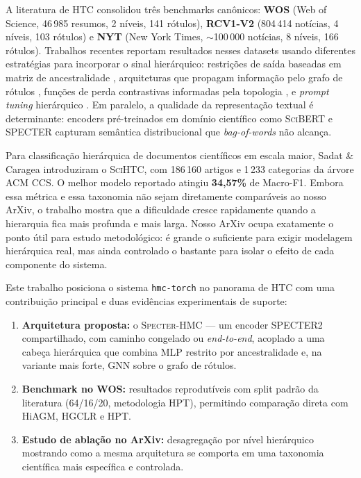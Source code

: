 \documentclass[11pt,a4paper,twoside]{article}
\begin{document}
A literatura de HTC consolidou três benchmarks canônicos: \textbf{WOS} (Web of Science,
46\,985 resumos, 2 níveis, 141 rótulos), \textbf{RCV1-V2} (804\,414 notícias, 4 níveis,
103 rótulos) e \textbf{NYT} (New York Times, $\sim$100\,000 notícias, 8 níveis, 166
rótulos). Trabalhos recentes reportam resultados nesses datasets usando diferentes
estratégias para incorporar o sinal hierárquico: restrições de saída baseadas em
matriz de ancestralidade \cite{giunchiglia2020coherent}, arquiteturas que propagam
informação pelo grafo de rótulos \cite{zhou2020hiagm}, funções de perda contrastivas
informadas pela topologia \cite{wang2022hgclr}, e \textit{prompt tuning} hierárquico
\cite{wang2022hpt}. Em paralelo, a qualidade da representação textual é determinante:
encoders pré-treinados em domínio científico como \textsc{SciBERT}
\cite{beltagy2019scibert} e \textsc{SPECTER} \cite{cohan2020specter} capturam
semântica distribucional que \textit{bag-of-words} não alcança.

Para classificação hierárquica de documentos científicos em escala maior,
Sadat \& Caragea \cite{sadat2022scitc} introduziram o \textsc{SciHTC}, com
186\,160 artigos e 1\,233 categorias da árvore ACM CCS. O melhor modelo
reportado atingiu \textbf{34,57\%} de Macro-F1. Embora essa métrica e essa
taxonomia não sejam diretamente comparáveis ao nosso ArXiv, o trabalho mostra
que a dificuldade cresce rapidamente quando a hierarquia fica mais profunda e
mais larga. Nosso ArXiv ocupa exatamente o ponto útil para estudo
metodológico: é grande o suficiente para exigir modelagem hierárquica real,
mas ainda controlado o bastante para isolar o efeito de cada componente do
sistema.

Este trabalho posiciona o sistema \texttt{hmc-torch} no panorama de HTC com uma
contribuição principal e duas evidências experimentais de suporte:

\begin{enumerate}[leftmargin=*, itemsep=2pt]
  \item \textbf{Arquitetura proposta:} o \textsc{Specter-HMC} --- um encoder
        \textsc{SPECTER2} compartilhado, com caminho congelado ou
        \textit{end-to-end}, acoplado a uma cabeça hierárquica que combina MLP
        restrito por ancestralidade e, na variante mais forte, GNN sobre o grafo
        de rótulos.
  \item \textbf{Benchmark no WOS:} resultados reprodutíveis com split padrão da
        literatura (64/16/20, metodologia HPT), permitindo comparação direta com
        HiAGM, HGCLR e HPT.
  \item \textbf{Estudo de ablação no ArXiv:} desagregação por nível hierárquico
        mostrando como a mesma arquitetura se comporta em uma taxonomia
        científica mais específica e controlada.
\end{enumerate}
\end{document}
